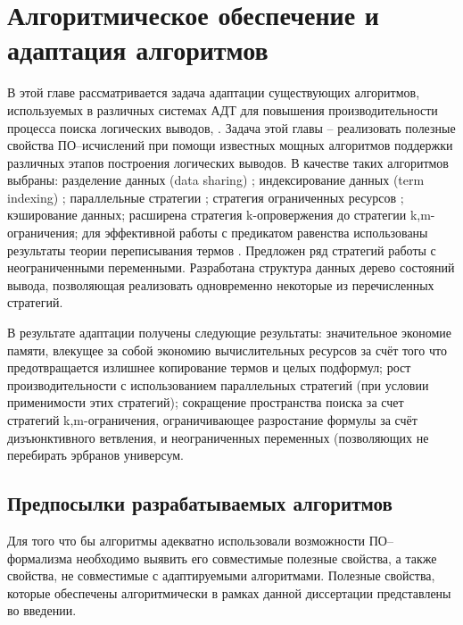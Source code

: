 \chapter{Алгоритмическое обеспечение и адаптация алгоритмов}

В этой главе рассматривается задача адаптации существующих алгоритмов, используемых в различных системах АДТ для повышения производительности процесса поиска логических выводов, . Задача этой главы -- реализовать полезные свойства ПО--исчислений при помощи известных мощных алгоритмов поддержки различных этапов построения логических выводов. В качестве таких алгоритмов выбраны: разделение данных (data sharing) \cite{Che2, Ryazanov2003}; индексирование данных (term indexing) \cite{HARIndex, TermIndexingBook,pathindex}; параллельные стратегии \cite{PSETHEO}; стратегия ограниченных ресурсов \cite{Ryazanov2003}; кэширование данных; расширена стратегия k-опровержения \cite{ICDS2000, dissChe} до стратегии k,m-ограничения; для эффективной работы с предикатом равенства использованы результаты теории переписывания термов \cite{Nipkow}. Предложен ряд стратегий работы с неограниченными переменными. Разработана структура данных дерево состояний вывода, позволяющая реализовать одновременно некоторые из перечисленных стратегий. 

В результате адаптации получены следующие результаты: значительное экономие памяти, влекущее за собой экономию вычислительных ресурсов за счёт того что предотвращается излишнее копирование термов и целых подформул; рост производительности с использованием параллельных стратегий (при условии применимости этих стратегий); сокращение пространства поиска за счет стратегий k,m-ограничения, ограничивающее разростание формулы за счёт дизъюнктивного ветвления, и неограниченных переменных (позволяющих не перебирать эрбранов универсум.  

\section{Предпосылки разрабатываемых алгоритмов}

Для того что бы алгоритмы адекватно использовали возможности ПО--формализма необходимо выявить его совместимые полезные свойства, а также свойства, не совместимые с адаптируемыми алгоритмами.  Полезные свойства, которые обеспечены алгоритмически в рамках данной диссертации представлены во введении.

